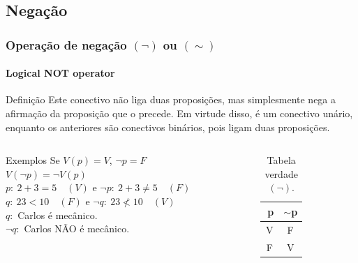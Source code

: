 \documentclass[10pt, headsepline, captions=tableabove,xcolor=table]{beamer}
\begin{document}
\subsection{Negação}
%
\begin{frame}[t]
    \frametitle{Operação de negação $(\lnot)$ ou $(\sim)$}
    \framesubtitle{Logical NOT operator}
    \begin{block}{Definição}
        Este conectivo não liga duas proposições, mas simplesmente nega a afirmação da proposição que o precede. Em virtude disso, é um conectivo unário, enquanto os anteriores são conectivos binários, pois ligam duas proposições.
    \end{block}
    \vspace{-4mm}
    \begin{columns}[t]
        \begin{column}{0.55\textwidth}
            \small
            \begin{exampleblock}{Exemplos}
                Se $V(p) = V$, $\lnot p = F$ \\ [2pt]
                $V(\lnot p) = \lnot V(p)$ \\ [2pt]
                $p:~2+3=5\quad (V)$ e $\lnot p:~2+3 \neq 5\quad (F)$ \\ [2pt]
                $q:~23 < 10 \quad (F)$ e $\lnot q:~23 \nless 10 \quad (V)$ \\[2pt]
                $q:$ Carlos é mecânico. \\[2pt]
                $\lnot q:$ Carlos NÃO é mecânico.
            \end{exampleblock}
        \end{column}
        \hspace{-5mm}
        \begin{column}{0.4\textwidth}
            \vspace{-3mm}
            \begin{table}[t]
                \caption{Tabela verdade $(\lnot)$.}
                \label{tab:tabela-not}
                \begin{tabular}{|c|c|}
                \hline
                \rowcolor[HTML]{EFEFEF} 
                \textbf{$~$p} & \textbf{$\sim$p} \\ \hline
                V          & F                \\ \hline
                F          & V                \\ \hline
                \end{tabular}
            \end{table}
        \end{column}
    \end{columns}
\end{frame}
%
\end{document}

